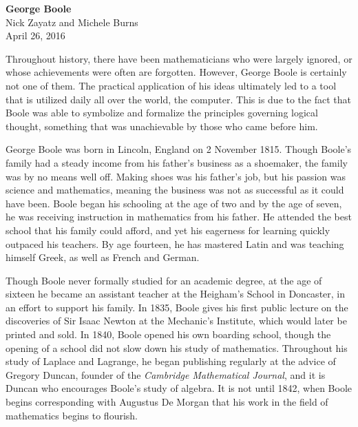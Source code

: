 \documentclass[12]{article} %
\begin{document}

 \begin{titlepage}
   \vspace*{\fill}
   \begin{center}
   \large \textbf {George Boole}\\[0.5cm]
    {Nick Zayatz and Michele Burns}\\[0.5cm]
    April 26, 2016
    \end{center}
    \vspace*{\fill}
    \end{titlepage}



Throughout history, there have been mathematicians who were largely ignored, or whose achievements were often are forgotten. However, George Boole is certainly not one of them. The practical application of his ideas ultimately led to a tool that is utilized daily all over the world, the computer. This is due to the fact that Boole was able to symbolize and formalize the principles governing logical thought, something that was unachievable by those who came before him. 


George Boole was born in Lincoln, England on 2 November 1815. Though Boole's family had a steady income from his father's business as a shoemaker, the family was by no means well off. Making shoes was his father's job, but his passion was science and mathematics, meaning the business was not as successful as it could have been. Boole began his schooling at the age of two and by the age of seven, he was receiving instruction in mathematics from his father. He attended the best school that his family could afford, and yet his eagerness for learning quickly outpaced his teachers. By age fourteen, he has mastered Latin and was teaching himself  Greek, as well as French and German.

Though Boole never formally studied for an academic degree, at the age of sixteen he became an assistant teacher at the Heigham's School in Doncaster, in an effort to support his family. In 1835, Boole gives his first public lecture on the discoveries of Sir Isaac Newton at the Mechanic's Institute, which would later be printed and sold. In 1840, Boole opened his own boarding school, though the opening of a school did not slow down his study of mathematics. Throughout his study of Laplace and Lagrange, he began publishing regularly at the advice of Gregory Duncan, founder of the \textit{Cambridge Mathematical Journal}, and it is Duncan who encourages Boole's study of algebra. It is not until 1842, when Boole begins corresponding with Augustus De Morgan that his work in the field of mathematics begins to flourish. 
\end{document}
